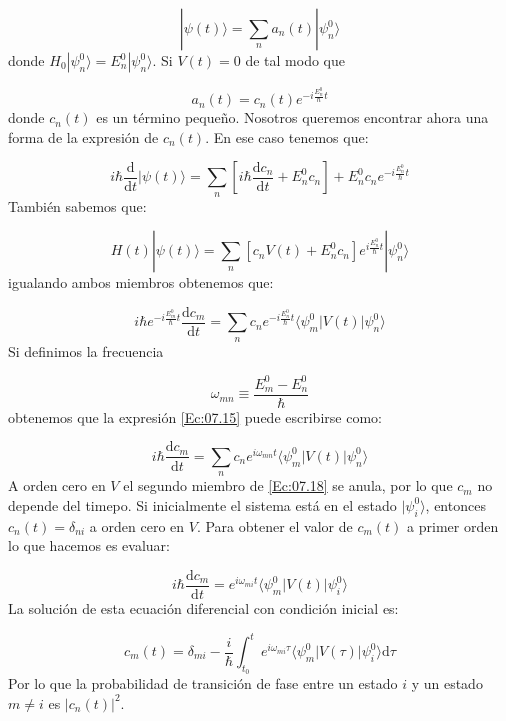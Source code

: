 \documentclass[12pt]{book}
\numberwithin{equation}{chapter}
\numberwithin{figure}{chapter}
\newcommand{\ccorchetes}[1]{\left[ #1  \right]}
\newcommand{\D}{\mathrm{d}}
\newcommand{\derivadas}[2]{\frac{\D #1}{\D #2}}
\begin{document}
\begin{equation}
|\psi(t)\rangle = \sum_n a_n (t) |\psi_n^0\rangle
\end{equation}
donde $H_0 |\psi_n^0\rangle = E_n^0 |\psi_n^0\rangle$. Si $V(t)=0$ de tal modo que 

\begin{equation}
a_n(t) = c_n(t) e^{- i \frac{E_n^0}{\hbar}t}
\end{equation}
donde $c_n(t)$ es un término pequeño. Nosotros queremos encontrar ahora una forma de la expresión de $c_n(t)$. En ese caso tenemos que:

\begin{equation}
i \hbar \derivadas{}{t}|\psi(t)\rangle = \sum_n \ccorchetes{i\hbar \derivadas{c_n}{t}+E_n^0 c_n}+E_n^0 c_n e^{-i\frac{E_n^0}{\hbar}t}
\end{equation}
También sabemos que:

\begin{equation}
H(t) |\psi (t) \rangle = \sum_n \ccorchetes{c_n V(t) + E_n^0 c_n}e^{i \frac{E_n^0}{\hbar} t} |\psi_n^0 \rangle
\end{equation}
igualando ambos miembros obtenemos que:

\begin{equation}
i \hbar e^{-i\frac{E^0_m}{\hbar}t} \derivadas{c_m}{t} = \sum_n c_n e^{- i \frac{E_n^0}{\hbar} t} \langle \psi_m^0 | V(t) | \psi_n^0\rangle
\label{Ec:07.15}
\end{equation}
Si definimos la frecuencia 

\begin{equation}
\omega_{mn} \equiv \frac{E_m^0 - E_n^0}{\hbar}
\end{equation}
obtenemos  que la expresión \ref{Ec:07.15} puede escribirse como:

\begin{equation}
i \hbar \derivadas{c_m}{t} = \sum_n c_n e^{i \omega_{mn} t} \langle \psi_m^0 | V(t) | \psi_n^0 \rangle  \label{Ec:07.18}
\end{equation}
A orden cero en $V$ el segundo miembro de \ref{Ec:07.18} se anula, por lo que $c_m$ no depende del timepo. Si inicialmente el sistema está en el estado $|\psi_i^0\rangle$, entonces $c_n(t)=\delta_{ni}$ a orden cero en $V$. Para obtener el valor de $c_m(t)$ a primer orden lo que hacemos es evaluar:

\begin{equation}
i \hbar \derivadas{c_m}{t} = e^{i \omega_{mi} t} \langle \psi_m^0 | V (t) | \psi_i^0 \rangle
\end{equation}
La solución de esta ecuación diferencial con condición inicial es:

\begin{equation}
c_m(t) = \delta_{mi} - \frac{i}{\hbar} \int_{t_0}^t e^{i\omega_{mi} \tau} \langle \psi_m^0 | V(\tau) | \psi_i^0\rangle \D \tau 
\end{equation}
Por lo que la probabilidad de transición de fase entre un estado $i$ y un estado $m\neq i$ es $|c_n(t)|^2$.
\end{document}
